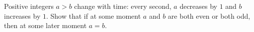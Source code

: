 Positive integers $a>b$ change with time: every second, $a$ decreases by $1$ and $b$ increases by $1$. Show that if at some moment $a$ and $b$ are both even or both odd, then at some later moment $a=b$.
